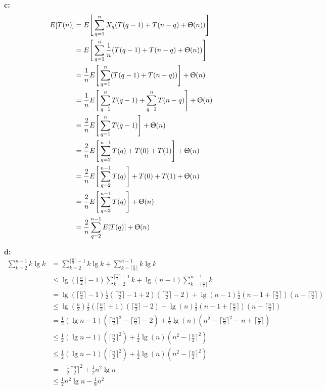 \documentclass{book}
\begin{document}
\begin{CJK}{UTF8}{gkai}
\textbf{c:}
\begin{align*}
E[T(n)] &= E\Bigg[\sum_{q=1}^{n}X_q(T(q-1)+T(n-q)+\Uptheta(n)) \Bigg] \\
&= E\Bigg[\sum_{q=1}^{n}\frac{1}{n}(T(q-1)+T(n-q)+\Uptheta(n)) \Bigg] \\
&= \frac{1}{n}E\Bigg[\sum_{q=1}^{n}(T(q-1)+T(n-q)) \Bigg] + \Uptheta(n) \\
&= \frac{1}{n}E\Bigg[\sum_{q=1}^{n}T(q-1)+\sum_{q=1}^{n}T(n-q) \Bigg] + \Uptheta(n) \\
&= \frac{2}{n}E\Bigg[\sum_{q=1}^{n}T(q-1) \Bigg] + \Uptheta(n) \\
&= \frac{2}{n}E\Bigg[\sum_{q=2}^{n-1}T(q)+ T(0) + T(1)\Bigg] + \Uptheta(n) \\
&= \frac{2}{n}E\Bigg[\sum_{q=2}^{n-1}T(q)\Bigg] + T(0) + T(1) + \Uptheta(n) \\
&= \frac{2}{n}E\Bigg[\sum_{q=2}^{n-1}T(q)\Bigg] + \Uptheta(n) \\
&= \frac{2}{n}\sum_{q=2}^{n-1}E[T(q)] + \Uptheta(n)
\end{align*}

\textbf{d:}
\begin{align*}
\sum_{k=2}^{n-1}k\lg k & = \sum_{k=2}^{\lceil\frac{n}{2}\rceil -1}k\lg k + 
\sum_{k=\lceil\frac{n}{2}\rceil}^{n-1}k\lg k \\
& \le \lg(\lceil\frac{n}{2}\rceil-1)\sum_{k=2}^{\lceil\frac{n}{2}\rceil-1} k + 
\lg(n-1)\sum_{k=\lceil\frac{n}{2}\rceil}^{n-1}k \\
& = \lg(\lceil\frac{n}{2}\rceil-1) 
\frac{1}{2}(\lceil\frac{n}{2}\rceil-1+2)(\lceil\frac{n}{2}\rceil-2) + 
\lg(n-1)\frac{1}{2}(n-1+\lceil\frac{n}{2}\rceil)(n-\lceil\frac{n}{2}\rceil) \\
& \le \lg(\frac{n}{2})
\frac{1}{2}(\lceil\frac{n}{2}\rceil+1)(\lceil\frac{n}{2}\rceil-2) + 
\lg(n)\frac{1}{2}(n-1+\lceil\frac{n}{2}\rceil)(n-\lceil\frac{n}{2}\rceil) \\
& = \frac{1}{2}(\lg n-1)(\lceil\frac{n}{2}\rceil^2-\lceil\frac{n}{2}\rceil - 
2) + \frac{1}{2}\lg(n)(n^2-\lceil\frac{n}{2}\rceil^2-n+\lceil\frac{n}{2}\rceil) 
   \\
& \le \frac{1}{2}(\lg n-1)(\lceil\frac{n}{2}\rceil^2) + \frac{1}{2}\lg(n)(n^2-\lceil\frac{n}{2}\rceil^2) \\
& \le \frac{1}{2}(\lg n-1)(\lceil\frac{n}{2}\rceil^2) + 
\frac{1}{2}\lg(n)(n^2-\lceil\frac{n}{2}\rceil^2) \\
& = -\frac{1}{2}\lceil\frac{n}{2}\rceil^2 + \frac{1}{2}n^2\lg n \\
& \le \frac{1}{2}n^2\lg n - \frac{1}{8}n^2
\end{align*}


\end{CJK}
\end{document}
